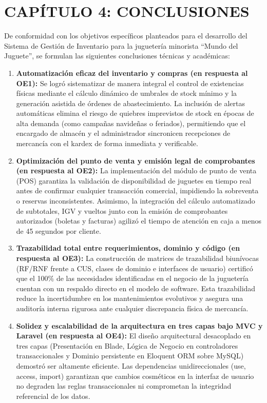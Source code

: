 \documentclass[12pt,a4paper]{article}
\begin{document}


\clearpage
\section{CAP\'ITULO 4: CONCLUSIONES}

De conformidad con los objetivos específicos planteados para el desarrollo del Sistema de Gestión de Inventario para la juguetería minorista ``Mundo del Juguete'', se formulan las siguientes conclusiones técnicas y académicas:

\begin{enumerate}
    \item \textbf{Automatización eficaz del inventario y compras (en respuesta al OE1):} Se logró sistematizar de manera integral el control de existencias físicas mediante el cálculo dinámico de umbrales de stock mínimo y la generación asistida de órdenes de abastecimiento. La inclusión de alertas automáticas elimina el riesgo de quiebres imprevistos de stock en épocas de alta demanda (como campañas navideñas o feriados), permitiendo que el encargado de almacén y el administrador sincronicen recepciones de mercancía con el kardex de forma inmediata y verificable.
    \item \textbf{Optimización del punto de venta y emisión legal de comprobantes (en respuesta al OE2):} La implementación del módulo de punto de venta (POS) garantiza la validación de disponibilidad de juguetes en tiempo real antes de confirmar cualquier transacción comercial, impidiendo la sobreventa o reservas inconsistentes. Asimismo, la integración del cálculo automatizado de subtotales, IGV y vueltos junto con la emisión de comprobantes autorizados (boletas y facturas) agilizó el tiempo de atención en caja a menos de 45 segundos por cliente.
    \item \textbf{Trazabilidad total entre requerimientos, dominio y código (en respuesta al OE3):} La construcción de matrices de trazabilidad biunívocas (RF/RNF frente a CUS, clases de dominio e interfaces de usuario) certificó que el 100\% de las necesidades identificadas en el negocio de la juguetería cuentan con un respaldo directo en el modelo de software. Esta trazabilidad reduce la incertidumbre en los mantenimientos evolutivos y asegura una auditoría interna rigurosa ante cualquier discrepancia física de mercancía.
    \item \textbf{Solidez y escalabilidad de la arquitectura en tres capas bajo MVC y Laravel (en respuesta al OE4):} El diseño arquitectural desacoplado en tres capas (Presentación en Blade, Lógica de Negocio en controladores transaccionales y Dominio persistente en Eloquent ORM sobre MySQL) demostró ser altamente eficiente. Las dependencias unidireccionales (\guillemotleft use\guillemotright, \guillemotleft access\guillemotright, \guillemotleft import\guillemotright) garantizan que cambios cosméticos en la interfaz de usuario no degraden las reglas transaccionales ni comprometan la integridad referencial de los datos.

\end{enumerate}
\end{document}
